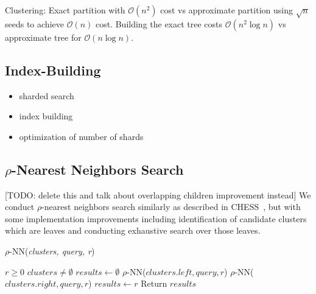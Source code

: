 Clustering: Exact partition with $\mathcal{O}(n^2)$ cost vs approximate partition using $\sqrt{n}$ seeds to achieve $\mathcal{O}(n)$ cost.
Building the exact tree costs $\mathcal{O}(n^2 \log n)$ vs approximate tree for $\mathcal{O}(n \log n)$.


\subsection {Index-Building}
\begin{itemize}
    \item sharded search
    \item index building 
    \item optimization of number of shards 
\end{itemize}

\subsection{\texorpdfstring{$\rho$}{p}-Nearest Neighbors Search}
\label{subsec:methods:rnn-search}


[TODO: delete this and talk about overlapping children improvement instead]
We conduct $\rho$-nearest neighbors search similarly as described in CHESS~\cite{ishaq2019clustered}, but 
with some implementation improvements including identification of candidate clusters which are leaves and 
conducting exhaustive search over those leaves.

\begin{algorithm} 
    \caption{$\rho$-NN(\emph{clusters, query, r})} 
    \label{alg:rnn} 
    \begin{algorithmic}[2]
        \REQUIRE $r \geq 0$
        \REQUIRE $clusters \neq \emptyset$
        \STATE $results \leftarrow \emptyset$
                \STATE $\rho$-NN($clusters.left, query, r$)
            \ENDIF
        \ENDIF
                \STATE $\rho$-NN($clusters.right, query, r$)
            \ENDIF
        \ENDIF
                    \STATE $results \leftarrow r$
                \ENDIF
            \ENDFOR
        \ENDIF
        \STATE Return $results$
    \end{algorithmic}
    \end{algorithm}

